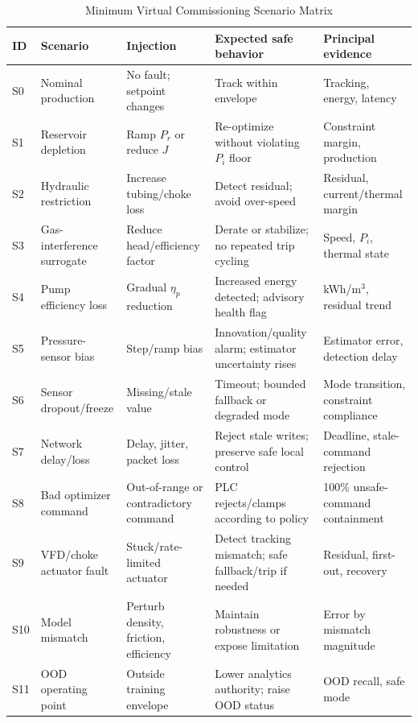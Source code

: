 \documentclass[conference]{IEEEtran}
\begin{document}
\begin{table}[t]
\caption{Minimum Virtual Commissioning Scenario Matrix}
\label{tab:scenarios}
\centering
\footnotesize
\begin{tabularx}{\textwidth}{p{}p{}Y Y p{0.17\textwidth}}
\toprule
ID & Scenario & Injection & Expected safe behavior & Principal evidence \\
\midrule
S0 & Nominal production & No fault; setpoint changes & Track within envelope & Tracking, energy, latency \\
S1 & Reservoir depletion & Ramp $P_r$ or reduce $J$ & Re-optimize without violating $P_i$ floor & Constraint margin, production \\
S2 & Hydraulic restriction & Increase tubing/choke loss & Detect residual; avoid over-speed & Residual, current/thermal margin \\
S3 & Gas-interference surrogate & Reduce head/efficiency factor & Derate or stabilize; no repeated trip cycling & Speed, $P_i$, thermal state \\
S4 & Pump efficiency loss & Gradual $\eta_p$ reduction & Increased energy detected; advisory health flag & kWh/m$^3$, residual trend \\
S5 & Pressure-sensor bias & Step/ramp bias & Innovation/quality alarm; estimator uncertainty rises & Estimator error, detection delay \\
S6 & Sensor dropout/freeze & Missing/stale value & Timeout; bounded fallback or degraded mode & Mode transition, constraint compliance \\
S7 & Network delay/loss & Delay, jitter, packet loss & Reject stale writes; preserve safe local control & Deadline, stale-command rejection \\
S8 & Bad optimizer command & Out-of-range or contradictory command & PLC rejects/clamps according to policy & 100\% unsafe-command containment \\
S9 & VFD/choke actuator fault & Stuck/rate-limited actuator & Detect tracking mismatch; safe fallback/trip if needed & Residual, first-out, recovery \\
S10 & Model mismatch & Perturb density, friction, efficiency & Maintain robustness or expose limitation & Error by mismatch magnitude \\
S11 & OOD operating point & Outside training envelope & Lower analytics authority; raise OOD status & OOD recall, safe mode \\
\bottomrule
\end{tabularx}
\end{table}
\end{document}
